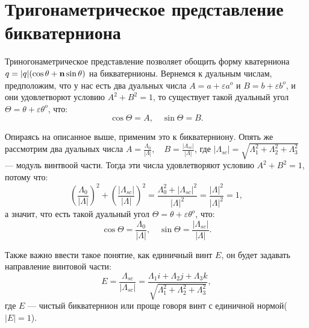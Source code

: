 \section{Тригонаметрическое представление бикватерниона}

Триногонаметрическое представление позволяет обощить форму кватерниона $q = |q|(\cos\theta + \vb{n}\sin\theta)$ на бикватернионы.
Вернемся к дуальным числам, предположим, что у нас есть два дуальных числа $A = a + \varepsilon a^o$ и $B = b + \varepsilon b^o$, и они удовлетворют условию $A^2 + B^2 = 1$, то существует такой дуальный угол $\Theta = \theta + \varepsilon \theta^o$, что:
\begin{equation*}
    \cos\Theta = A, \quad \sin\Theta = B.
\end{equation*}

Опираясь на описанное выше, применим это к бикватерниону. Опять же рассмотрим два дуальных числа $A = \frac{\Lambda_0}{|\Lambda|}, \quad B = \frac{|\Lambda_{sc}|}{|\Lambda|}$, где $|\Lambda_{sc}| = \sqrt{\Lambda_1^2 + \Lambda_2^2 + \Lambda_3^2}$ --- модуль винтвоой части.
Тогда эти числа удовлетворяют условию $A^2 + B^2 = 1$, потому что:
\begin{equation*}
    \left(\frac{\Lambda_0}{|\Lambda|}\right)^2 + \left(\frac{|\Lambda_{sc}|}{|\Lambda|}\right)^2 = \frac{\Lambda_0^2 + |\Lambda_{sc}|^2}{|\Lambda|^2} = \frac{|\Lambda|^2}{|\Lambda|^2} = 1,
\end{equation*}
а значит, что есть такой дуальный угол $\Theta = \theta + \varepsilon \theta^o$, что:
\begin{equation*}
    \cos\Theta = \frac{\Lambda_0}{|\Lambda|}, \quad \sin\Theta = \frac{|\Lambda_{sc}|}{|\Lambda|}.
\end{equation*}

Также важно ввести такое понятие, как единичный винт $E$, он будет задавать направление винтовой части:
\begin{equation*}
    E = \frac{\Lambda_{sc}}{|\Lambda_{sc}|} = \frac{\Lambda_1 i + \Lambda_2 j + \Lambda_3 k}{\sqrt{\Lambda_1^2 + \Lambda_2^2 + \Lambda_3^2}},
\end{equation*}
где $E$ --- чистый бикватернион или проще говоря винт с единичной нормой($|E| = 1$).

